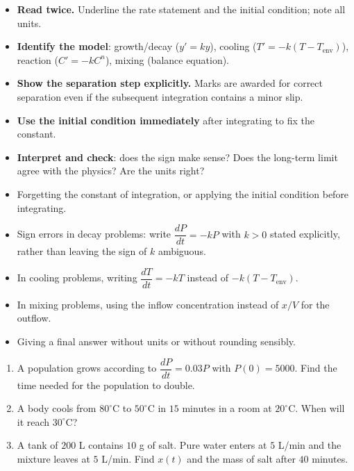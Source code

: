 \documentclass[11pt]{article}
\begin{document}
\begin{aretenir}
\begin{itemize}
\item \textbf{Read twice.} Underline the rate statement and the initial condition; note all units.
\item \textbf{Identify the model}: growth/decay ($y'=ky$), cooling ($T'=-k(T-T_{\mathrm{env}})$), reaction ($C'=-kC^{n}$), mixing (balance equation).
\item \textbf{Show the separation step explicitly.} Marks are awarded for correct separation even if the subsequent integration contains a minor slip.
\item \textbf{Use the initial condition immediately} after integrating to fix the constant.
\item \textbf{Interpret and check}: does the sign make sense? Does the long-term limit agree with the physics? Are the units right?
\end{itemize}
\end{aretenir}

\begin{attention}
\begin{itemize}
\item Forgetting the constant of integration, or applying the initial condition before integrating.
\item Sign errors in decay problems: write $\dfrac{dP}{dt}=-kP$ with $k>0$ stated explicitly, rather than leaving the sign of $k$ ambiguous.
\item In cooling problems, writing $\dfrac{dT}{dt}=-kT$ instead of $-k(T-T_{\mathrm{env}})$.
\item In mixing problems, using the inflow concentration instead of $x/V$ for the outflow.
\item Giving a final answer without units or without rounding sensibly.
\end{itemize}
\end{attention}

\begin{exercice}[Practice]
\begin{enumerate}
\item A population grows according to $\dfrac{dP}{dt}=0.03P$ with $P(0)=5000$. Find the time needed for the population to double.
\item A body cools from $80^\circ\mathrm{C}$ to $50^\circ\mathrm{C}$ in $15$ minutes in a room at $20^\circ\mathrm{C}$. When will it reach $30^\circ\mathrm{C}$?
\item A tank of $200$ L contains $10$ g of salt. Pure water enters at $5$ L/min and the mixture leaves at $5$ L/min. Find $x(t)$ and the mass of salt after $40$ minutes.
\end{enumerate}
\end{exercice}
\end{document}
